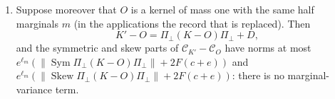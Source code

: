 \begin{lemma}
\begin{enumerate}[label=\textup{(\alph*)}]
 $1+u_0\ge e^{-\ell_m}$ and $\|u_0\|_\nu^2\le b_0$. Then
 \[
  K'-(1+u_0)\otimes(1+u_0)=K_c+D-u_0\otimes u_0 ,
 \]
 and the norms of $\mathcal C_{K'}$, of its symmetric part and of
 its skew part are at most
 \[
  e^{\ell_m}\bigl(c+2F(c+e)+b_0\bigr),\qquad
  e^{\ell_m}\bigl(s+2F(c+e)+b_0\bigr),\qquad
  e^{\ell_m}\bigl(a+2F(c+e)\bigr).
 \]
\item Suppose moreover that $O$ is a kernel of mass one with the same half
 marginals $m$ (in the applications the record that is replaced). Then
 \[
  K'-O=\Pi_\perp(K-O)\Pi_\perp+D ,
 \]
 and the symmetric and skew parts of $\mathcal C_{K'}-\mathcal C_O$ have norms at
 most $e^{\ell_m}(\|\operatorname{Sym}\Pi_\perp(K-O)\Pi_\perp\|+2F(c+e))$ and
 $e^{\ell_m}(\|\operatorname{Skew}\Pi_\perp(K-O)\Pi_\perp\|+2F(c+e))$: there is no
 marginal-variance term.
\end{enumerate}
\end{lemma}

